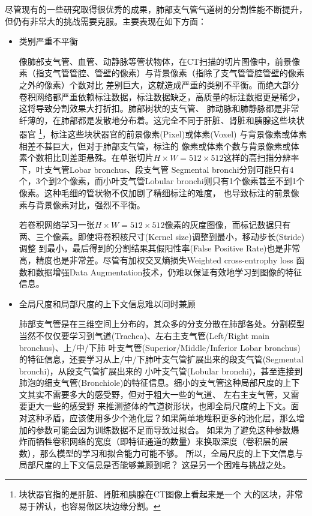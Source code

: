 尽管现有的一些研究取得很优秀的成果，肺部支气管气道树的分割性能不断提升，但仍有非常大的挑战需要克服。主要表现在如下方面：
\begin{itemize}
	\item {\heiti 类别严重不平衡}
	
	像肺部支气管、血管、动静脉等管状物体，在CT扫描的切片图像中，前景像素（指支气管管腔、管壁的像素）与背景像素（指除了支气管管腔管壁的像素之外的像素）个数对比
	差别巨大，这就造成严重的类别不平衡。而绝大部分卷积网络都严重依赖标注数据，标注数据缺乏，高质量的标注数据更是稀少，这将导致分割效果大打折扣。肺部树状的支气管、
	肺动脉和肺静脉都是非常纤薄的，在肺部都是发散地分布着。这完全不同于肝脏、肾脏和胰腺这些块状器官
	\footnote{块状器官指的是肝脏、肾脏和胰腺在CT图像上看起来是一个
	大的区块，非常易于辨认，也容易做区块边缘分割。}，标注这些块状器官的前景像素(Pixel)或体素(Voxel)
	与背景像素或体素相差不甚巨大，但对于肺部支气管，标注的
	像素或体素个数与背景像素或体素个数相比则差距悬殊。在单张切片$H \times W = 512 \times 512$这样的高扫描分辨率下，叶支气管Lobar bronchus、段支气管
	Segmental bronchi分别可能只有4个，3个到2个像素，而小叶支气管Lobular bronchi则只有1个像素甚至不到1个像素。这种毛细的管状物不仅加剧了精细标注的难度，
	也导致标注的前景像素与背景像素对比，强烈不平衡。
	
	若卷积网络学习一张$H \times W = 512 \times 512$像素的灰度图像，而标记数据只有两、三个像素。即使将卷积核尺寸(Kernel size)调整到最小，移动步长(Stride)调整
	到最小，最后得到的分割结果其假阳性率(False Positive Rate)也是非常高，精度也是非常差。尽管有加权交叉熵损失Weighted cross-entrophy loss
	\cite{Yuri2019WeightedCrossEntrophy}函数和数据增强Data Augmentation技术，仍难以保证有效地学习到图像的特征信息。
	
	\item {\heiti 全局尺度和局部尺度的上下文信息难以同时兼顾}
	
	肺部支气管是在三维空间上分布的，其众多的分支分散在肺部各处。分割模型当然不仅仅要学习到气道(Trachea)、左右主支气管(Left/Right main bronchus)、上/中/下肺
	叶支气管(Superior/Middle/Inferior Lobar bronchus)的特征信息，还要学习从上/中/下肺叶支气管扩展出来的段支气管(Segmental bronchi)，从段支气管扩展出来的
	小叶支气管(Lobular bronchi)，甚至连接到肺泡的细支气管(Bronchiole)的特征信息。细小的支气管这种局部尺度的上下文其实不需要多大的感受野，但对于粗大一些的气道、
	左右主支气管，又需要更大一些的感受野
	来推测整体的气道树形状，也即全局尺度的上下文。面对这种矛盾，应该使用多少个池化层？如果简单地堆积更多的池化层，那么增加的参数可能会因为训练数据不足而导致过拟合。
	如果为了避免这种参数爆炸而牺牲卷积网络的宽度（即特征通道的数量）来换取深度（卷积层的层数），那么模型的学习和拟合能力可能不够\cite{Qin2021TubuleSen}。
	所以，全局尺度的上下文信息与局部尺度的上下文信息是否能够兼顾到呢？ 这是另一个困难与挑战之处。
\end{itemize}


